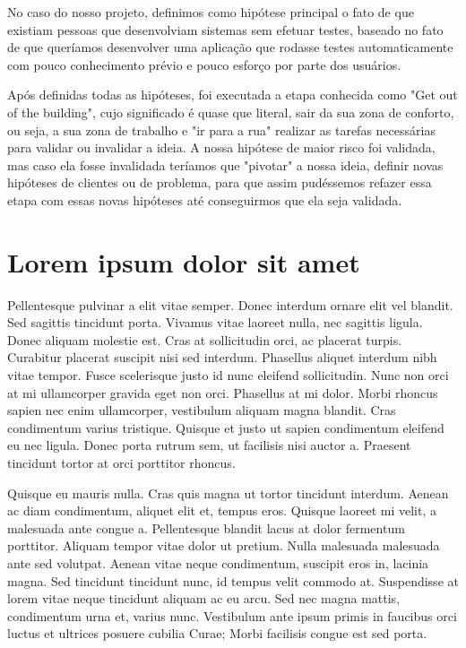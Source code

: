 No caso do nosso projeto, definimos como hipótese principal o fato de que existiam pessoas que desenvolviam sistemas sem efetuar testes, baseado no fato de que queríamos desenvolver uma aplicação que rodasse testes automaticamente com pouco conhecimento prévio e pouco esforço por parte dos usuários.

Após definidas todas as hipóteses, foi executada a etapa conhecida como "Get out of the building", cujo significado é quase que literal, sair da sua zona de conforto, ou seja, a sua zona de trabalho e "ir para a rua" realizar as tarefas necessárias para validar ou invalidar a ideia. A nossa hipótese de maior risco foi validada, mas caso ela fosse invalidada teríamos que "pivotar" a nossa ideia, definir novas hipóteses de clientes ou de problema, para que assim pudéssemos refazer essa etapa com essas novas hipóteses até conseguirmos que ela seja validada.


\section{Lorem ipsum dolor sit amet}\label{sec:LABEL_CHP_1_SEC_G}
Pellentesque pulvinar a elit vitae semper. Donec interdum ornare elit vel blandit. Sed sagittis tincidunt porta. Vivamus vitae laoreet nulla, nec sagittis ligula. Donec aliquam molestie est. Cras at sollicitudin orci, ac placerat turpis. Curabitur placerat suscipit nisi sed interdum. Phasellus aliquet interdum nibh vitae tempor. Fusce scelerisque justo id nunc eleifend sollicitudin. Nunc non orci at mi ullamcorper gravida eget non orci. Phasellus at mi dolor. Morbi rhoncus sapien nec enim ullamcorper, vestibulum aliquam magna blandit. Cras condimentum varius tristique. Quisque et justo ut sapien condimentum eleifend eu nec ligula. Donec porta rutrum sem, ut facilisis nisi auctor a. Praesent tincidunt tortor at orci porttitor rhoncus.

Quisque eu mauris nulla. Cras quis magna ut tortor tincidunt interdum. Aenean ac diam condimentum, aliquet elit et, tempus eros. Quisque laoreet mi velit, a malesuada ante congue a. Pellentesque blandit lacus at dolor fermentum porttitor. Aliquam tempor vitae dolor ut pretium. Nulla malesuada malesuada ante sed volutpat. Aenean vitae neque condimentum, suscipit eros in, lacinia magna. Sed tincidunt tincidunt nunc, id tempus velit commodo at. Suspendisse at lorem vitae neque tincidunt aliquam ac eu arcu. Sed nec magna mattis, condimentum urna et, varius nunc. Vestibulum ante ipsum primis in faucibus orci luctus et ultrices posuere cubilia Curae; Morbi facilisis congue est sed porta.

